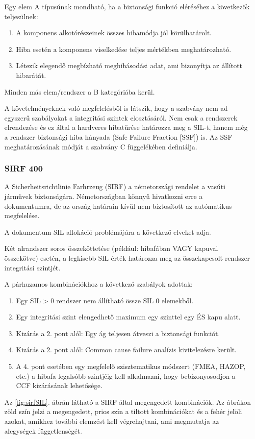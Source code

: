 Egy elem A típusúnak mondható, ha a biztonsági funkció eléréséhez a következők teljesülnek:
\begin{enumerate}
	\item A komponens alkotórészeinek összes hibamódja jól körülhatárolt.
	\item Hiba esetén a komponens viselkedése teljes mértékben meghatározható.
	\item Létezik elegendő megbízható meghibásodási adat, ami bizonyítja az állított hibarátát.
\end{enumerate}
Minden más elem/rendszer a B kategóriába kerül.

A követelményeknek való megfelelésből is látszik, hogy a szabvány nem ad egyszerű szabályokat a integritási szintek elosztásáról. 
Nem csak a rendszerek elrendezése és ez által a hardveres hibatűrése határozza meg a SIL-t, hanem még a rendszer biztonsági hiba hányada (Safe Failure Fraction [SSF]) is.
Az SSF meghatározásának módját a szabvány C függelékében definiálja.

\subsubsection{SIRF 400}
A Sicherheitsrichtlinie Farhrzeug (SIRF) a németországi rendelet a vasúti járművek biztonságára. 
Németországban könnyű hivatkozni erre a dokumentumra, de az ország határain kívül nem biztosított az autómatikus megfelelése.

A dokumentum SIL allokáció problémájára a következő elveket adja.

Két alrandszer soros összeköttetése (például: hibafában VAGY kapuval összekötve) esetén, a legkisebb SIL érték határozza meg az összekapcsolt rendszer integritási szintjét.

A párhuzamos kombinációkhoz a következő szabályok adottak:
\begin{enumerate}
	\item Egy SIL > 0 rendszer nem állítható össze SIL 0 elemekből.
	\item Egy integritási szint elengedhető maximum egy szinttel egy ÉS kapu alatt.
	\item Kizárás a 2. pont alól: Egy ág teljesen átveszi a biztonsági funkciót.
	\item Kizárás a 2. pont alól: Common cause failure analízis kivitelezésre került.
	\item A 4. pont esetében egy megfelelő szisztematikus módszert (FMEA, HAZOP, etc.) a hibafa legalsóbb szintjéig kell alkalmazni, hogy bebizonyosodjon a CCF kizárásának lehetősége.
\end{enumerate}
Az \ref{fig:sirfSIL}. ábrán látható a SIRF által megengedett kombinációk. 
Az ábrákon zöld szín jelzi a megengedett, prios szín a tiltott kombinációkat és a fehér jelöli azokat, amikhez további elemzést kell végrehajtani, ami megmutatja az alegységek függetlenségét.

